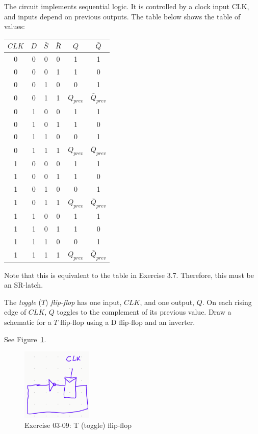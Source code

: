 \documentclass[12pt]{article}
\newenvironment{ex}[2][Exercise]{\begin{trivlist}
		\item[\hskip \labelsep {\bfseries #1}\hskip \labelsep {\bfseries #2.}]}{\end{trivlist}}
\newenvironment{sol}[1][Solution]{\begin{trivlist}
		\item[\hskip \labelsep {\bfseries #1:}]}{\end{trivlist}}
\begin{document}
\begin{sol}
	The circuit implements sequential logic. It is controlled by a clock input CLK, and inputs depend on previous outputs. The table below shows the table of values:
	\begin{center}
		\begin{tabular}{cccc|cc}
			$CLK$ & $D$ & $\bar{S}$ & $\bar{R}$ & $Q$ & $\bar{Q}$\\
			\hline
			0 & 0 & 0 & 0 & 1 & 1\\
			0 & 0 & 0 & 1 & 1 & 0\\
			0 & 0 & 1 & 0 & 0 & 1\\
			0 & 0 & 1 & 1 & $Q_{prev}$ & $\bar{Q}_{prev}$\\
			0 & 1 & 0 & 0 & 1 & 1\\
			0 & 1 & 0 & 1 & 1 & 0\\
			0 & 1 & 1 & 0 & 0 & 1\\
			0 & 1 & 1 & 1 & $Q_{prev}$ & $\bar{Q}_{prev}$\\
			1 & 0 & 0 & 0 & 1 & 1\\
			1 & 0 & 0 & 1 & 1 & 0\\
			1 & 0 & 1 & 0 & 0 & 1\\
			1 & 0 & 1 & 1 & $Q_{prev}$ & $\bar{Q}_{prev}$ \\
			1 & 1 & 0 & 0 & 1 & 1\\
			1 & 1 & 0 & 1 & 1 & 0\\
			1 & 1 & 1 & 0 & 0 & 1\\
			1 & 1 & 1 & 1 & $Q_{prev}$ & $\bar{Q}_{prev}$\\
		\end{tabular}
	\end{center}
	Note that this is equivalent to the table in Exercise 3.7. Therefore, this must be an SR-latch.
\end{sol}

\begin{ex}{3.9}
	The \emph{toggle} ($T$) \emph{flip-flop} has one input, $CLK$, and one output, $Q$. On each rising edge of $CLK$,
	$Q$ toggles to the complement of its previous value. Draw a schematic for a $T$ flip-flop using a D flip-flop
	and an inverter.
\end{ex}

\begin{sol}
	See Figure~\ref{03-09-T-toggle-flip-flop}.
	\begin{figure}
		\centering
		\includegraphics[width=0.3\textwidth]{03-09-T-toggle-flip-flop}
		\caption{Exercise 03-09: T (toggle) flip-flop}
		\label{03-09-T-toggle-flip-flop}
	\end{figure}
\end{sol}
\end{document}
